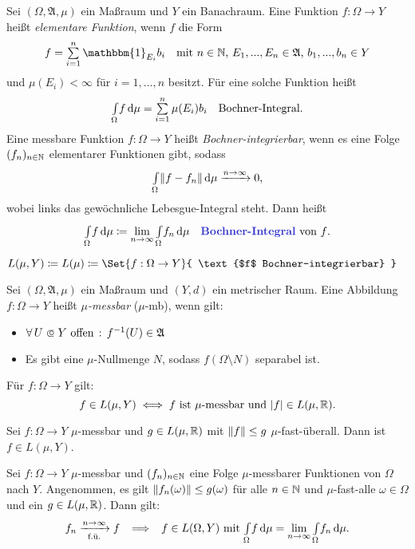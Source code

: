 \documentclass{cheat-sheet}
\newcommand{\Alg}{\mathfrak{A}} %
\newcommand{\ind}{\mathbbm{1}} %
\newcommand{\convWith}[1]{\xrightarrow{#1 \to \infty}} %
\begin{document}
\begin{defn}
  Sei $(\Omega, \Alg, \mu)$ ein Maßraum und $Y$ ein Banachraum. Eine Funktion $f : \Omega \to Y$ heißt \emph{elementare Funktion}, wenn $f$ die Form
  \[ f = \sum_{i=1}^n \ind_{E_i} b_i \quad \text{mit $n \in \N$, $E_1, ..., E_n \in \Alg$, $b_1, ..., b_n \in Y$} \]
  und $\mu(E_i) < \infty$ für $i = 1, ..., n$ besitzt. Für eine solche Funktion heißt
  \[ \Int{\Omega}{}{f}{\mu} = \sum_{i=1}^n \mu(E_i) b_i \quad \text{Bochner-Integral.} \]
  Eine messbare Funktion $f : \Omega \to Y$ heißt \emph{Bochner-integrierbar}, wenn es eine Folge $(f_n)_{n \in \mathbb{N}}$ elementarer Funktionen gibt, sodass
  \[ \Int{\Omega}{}{\norm{f - f_n}}{\mu} \convWith{n} 0, \]
  wobei links das gewöchnliche Lebesgue-Integral steht. Dann heißt
  \[ \Int{\Omega}{}{f}{\mu} \coloneqq \lim_{n \to \infty} \Int{\Omega}{}{f_n}{\mu} \quad \text{\emph{Bochner-Integral} von $f$.} \]
\end{defn}

\begin{nota}
  $L(\mu, Y) \coloneqq L(\mu) \coloneqq \Set{ f : \Omega \to Y }{ \text{$f$ Bochner-integrierbar} }$
\end{nota}


\begin{defn}
  Sei $(\Omega, \Alg, \mu)$ ein Maßraum und $(Y, d)$ ein metrischer Raum. Eine Abbildung $f : \Omega \to Y$ heißt \emph{$\mu$-messbar} ($\mu$-mb), wenn gilt:
  \begin{itemize}
    \item $\fa{U \opn Y \text{ offen}} f^{-1}(U) \in \Alg$
    \item Es gibt eine $\mu$-Nullmenge $N$, sodass $f(\Omega \setminus N)$ separabel ist.
  \end{itemize}
\end{defn}

\begin{satz}
  Für $f : \Omega \to Y$ gilt:
  \[ f \in L(\mu, Y) \iff f \text{ ist $\mu$-messbar und } \lvert f\rvert \in L(\mu, \mathbb{R}). \]
\end{satz}

\begin{satz}
  Sei $f : \Omega \to Y$ $\mu$-messbar und $g \in L(\mu, \mathbb{R})$ mit $\lVert f\rVert \leq g$ $\mu$-fast-überall. Dann ist $f \in L(\mu, Y)$.
\end{satz}

\begin{satz}
  Sei $f : \Omega \to Y$ $\mu$-messbar und $(f_n)_{n \in \mathbb{N}}$ eine Folge $\mu$-messbarer Funktionen von $\Omega$ nach $Y$. Angenommen, es gilt $\lVert f_n(\omega)\rVert \leq g(\omega)$ für alle $n \in \mathbb{N}$ und $\mu$-fast-alle $\omega \in \Omega$ und ein $g \in L(\mu, \mathbb{R})$. Dann gilt:
  \[ f_n \xrightarrow[\text{f.ü.}]{n \to \infty} f \enspace\implies\enspace f \in L(\Omega, Y) \text{ mit } {\textstyle \int\limits_{\Omega}^{}} f \,\mathrm{d} \mu = \lim_{n \to \infty} {\textstyle \int\limits_{\Omega}^{}} f_n \,\mathrm{d} \mu. \]
\end{satz}
\end{document}
